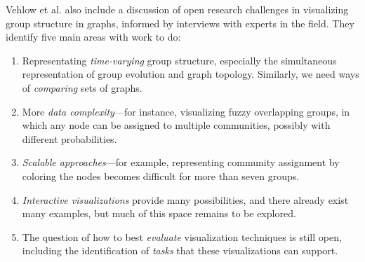 Vehlow et al. also include a discussion of open research challenges in
visualizing group structure in graphs, informed by interviews with
experts in the field. They identify five main areas with work to do:

\begin{enumerate}
\def\labelenumi{\arabic{enumi}.}
\tightlist
\item
  Representating \emph{time-varying} group structure, especially the
  simultaneous representation of group evolution and graph topology.
  Similarly, we need ways of \emph{comparing} sets of graphs.
\item
  More \emph{data complexity}---for instance, visualizing fuzzy
  overlapping groups, in which any node can be assigned to multiple
  communities, possibly with different probabilities.
\item
  \emph{Scalable approaches}---for example, representing community
  assignment by coloring the nodes becomes difficult for more than seven
  groups.
\item
  \emph{Interactive visualizations} provide many possibilities, and
  there already exist many examples, but much of this space remains to
  be explored.
\item
  The question of how to best \emph{evaluate} visualization techniques
  is still open, including the identification of \emph{tasks} that these
  visualizations can support.
\end{enumerate}
